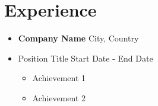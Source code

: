 \section*{Experience}
\begin{itemize}
    \item[] \textbf{Company Name} \hfill City, Country
    \item[] Position Title \hfill Start Date - End Date
    \begin{itemize}
        \item Achievement 1
        \item Achievement 2
    \end{itemize}
\end{itemize}
\sectionspace 
